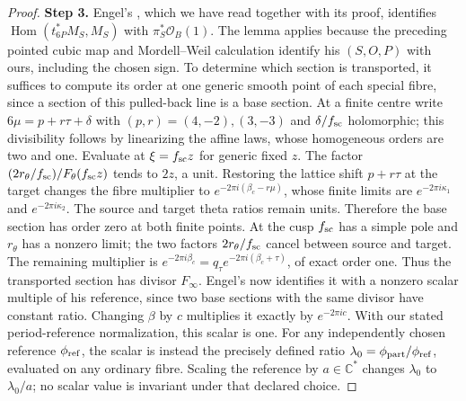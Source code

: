 \begin{proof}
\par\smallskip\noindent\textbf{Step 3.} Engel's \cite[Lemma 2.1]{E26}, which we have read together with its proof, identifies $\operatorname{Hom}(t_{6P}^*M_S,M_S)$ with $\pi_S^*\mathcal O_B(1)$. The lemma applies because the preceding pointed cubic map and Mordell--Weil calculation identify his $(S,O,P)$ with ours, including the chosen sign. To determine which section is transported, it suffices to compute its order at one generic smooth point of each special fibre, since a section of this pulled-back line is a base section. At a finite centre write $6\mu=p+r\tau+\delta$ with $(p,r)=(4,-2),(3,-3)$ and $\delta/f_{\rm sc}$ holomorphic; this divisibility follows by linearizing the affine laws, whose homogeneous orders are two and one. Evaluate at $\xi=f_{\rm sc}z$ for generic fixed $z$. The factor $(2r_\theta/f_{\rm sc})/F_\theta(f_{\rm sc}z)$ tends to $2z$, a unit. Restoring the lattice shift $p+r\tau$ at the target changes the fibre multiplier to $e^{-2\pi i(\beta_c-r\mu)}$, whose finite limits are $e^{-2\pi i\kappa_1}$ and $e^{-2\pi i\kappa_2}$. The source and target theta ratios remain units. Therefore the base section has order zero at both finite points. At the cusp $f_{\rm sc}$ has a simple pole and $r_\theta$ has a nonzero limit; the two factors $2r_\theta/f_{\rm sc}$ cancel between source and target. The remaining multiplier is
$e^{-2\pi i\beta_c}=q_\tau e^{-2\pi i(\beta_c+\tau)}$, of exact order one. Thus the transported section has divisor $F_\infty$. Engel's \cite[Corollary 2.2]{E26} now identifies it with a nonzero scalar multiple of his reference, since two base sections with the same divisor have constant ratio. Changing $\beta$ by $c$ multiplies it exactly by $e^{-2\pi ic}$. With our stated period-reference normalization, this scalar is one. For any independently chosen reference $\phi_{\rm ref}$, the scalar is instead the precisely defined ratio $\lambda_0=\phi_{\rm part}/\phi_{\rm ref}$, evaluated on any ordinary fibre. Scaling the reference by $a\in\mathbb C^*$ changes $\lambda_0$ to $\lambda_0/a$; no scalar value is invariant under that declared choice.
\end{proof}

